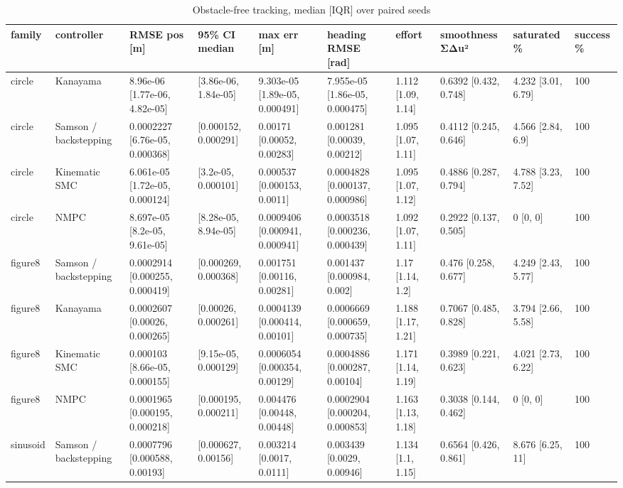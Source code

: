 \begin{table}
\caption{Obstacle-free tracking, median [IQR] over paired seeds}
\label{tab:tracking_summary}
\begin{tabular}{llllllllll}
\toprule
family & controller & RMSE pos [m] & 95\% CI median & max err [m] & heading RMSE [rad] & effort & smoothness ΣΔu² & saturated \% & success \% \\
\midrule
circle & Kanayama & 8.96e-06 [1.77e-06, 4.82e-05] & [3.86e-06, 1.84e-05] & 9.303e-05 [1.89e-05, 0.000491] & 7.955e-05 [1.86e-05, 0.000475] & 1.112 [1.09, 1.14] & 0.6392 [0.432, 0.748] & 4.232 [3.01, 6.79] & 100 \\
circle & Samson / backstepping & 0.0002227 [6.76e-05, 0.000368] & [0.000152, 0.000291] & 0.00171 [0.00052, 0.00283] & 0.001281 [0.00039, 0.00212] & 1.095 [1.07, 1.11] & 0.4112 [0.245, 0.646] & 4.566 [2.84, 6.9] & 100 \\
circle & Kinematic SMC & 6.061e-05 [1.72e-05, 0.000124] & [3.2e-05, 0.000101] & 0.000537 [0.000153, 0.0011] & 0.0004828 [0.000137, 0.000986] & 1.095 [1.07, 1.12] & 0.4886 [0.287, 0.794] & 4.788 [3.23, 7.52] & 100 \\
circle & NMPC & 8.697e-05 [8.2e-05, 9.61e-05] & [8.28e-05, 8.94e-05] & 0.0009406 [0.000941, 0.000941] & 0.0003518 [0.000236, 0.000439] & 1.092 [1.07, 1.11] & 0.2922 [0.137, 0.505] & 0 [0, 0] & 100 \\
figure8 & Samson / backstepping & 0.0002914 [0.000255, 0.000419] & [0.000269, 0.000368] & 0.001751 [0.00116, 0.00281] & 0.001437 [0.000984, 0.002] & 1.17 [1.14, 1.2] & 0.476 [0.258, 0.677] & 4.249 [2.43, 5.77] & 100 \\
figure8 & Kanayama & 0.0002607 [0.00026, 0.000265] & [0.00026, 0.000261] & 0.0004139 [0.000414, 0.00101] & 0.0006669 [0.000659, 0.000735] & 1.188 [1.17, 1.21] & 0.7067 [0.485, 0.828] & 3.794 [2.66, 5.58] & 100 \\
figure8 & Kinematic SMC & 0.000103 [8.66e-05, 0.000155] & [9.15e-05, 0.000129] & 0.0006054 [0.000354, 0.00129] & 0.0004886 [0.000287, 0.00104] & 1.171 [1.14, 1.19] & 0.3989 [0.221, 0.623] & 4.021 [2.73, 6.22] & 100 \\
figure8 & NMPC & 0.0001965 [0.000195, 0.000218] & [0.000195, 0.000211] & 0.004476 [0.00448, 0.00448] & 0.0002904 [0.000204, 0.000853] & 1.163 [1.13, 1.18] & 0.3038 [0.144, 0.462] & 0 [0, 0] & 100 \\
sinusoid & Samson / backstepping & 0.0007796 [0.000588, 0.00193] & [0.000627, 0.00156] & 0.003214 [0.0017, 0.0111] & 0.003439 [0.0029, 0.00946] & 1.134 [1.1, 1.15] & 0.6564 [0.426, 0.861] & 8.676 [6.25, 11] & 100 \\

\end{tabular}
\end{table}
